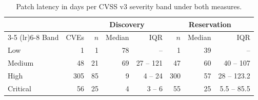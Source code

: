 \begin{table}[h]
    \centering
    \caption{Patch latency in days per CVSS v3 severity band under both measures.}
    \label{tab:severity}
    \small
    \setlength{\tabcolsep}{4pt}
    \begin{tabular}{lrrrrrrr}
        \toprule
        & & \multicolumn{3}{c}{Discovery} & \multicolumn{3}{c}{Reservation} \\
        \cmidrule(lr){3-5} \cmidrule(lr){6-8}
        Band & CVEs & $n$ & Median & IQR & $n$ & Median & IQR \\
        \midrule
        Low      & 1 & 1 & 78 & -- & 1 & 39 & -- \\
        Medium   & 48 & 21 & 69 & 27 -- 121 & 47 & 60 & 40 -- 107 \\
        High     & 305 & 85 & 9 & 4 -- 24 & 300 & 57 & 28 -- 123.2 \\
        Critical & 56 & 25 & 4 & 3 -- 6 & 55 & 25 & 5.5 -- 85.5 \\
        \bottomrule
    \end{tabular}
\end{table}
